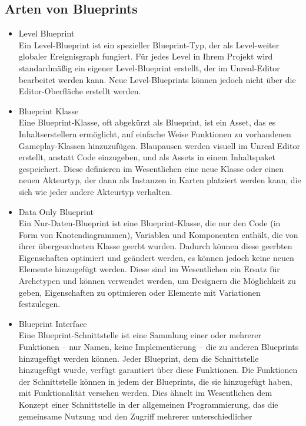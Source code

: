 \subsection{Arten von Blueprints}
\begin{itemize}
    \item Level Blueprint\\
    Ein Level-Blueprint ist ein spezieller Blueprint-Typ, der als Level-weiter globaler Ereignisgraph
    fungiert. Für jedes Level in Ihrem Projekt wird standardmäßig ein eigener Level-Blueprint erstellt,
    der im Unreal-Editor bearbeitet werden kann. Neue Level-Blueprints können jedoch nicht über die
    Editor-Oberfläche erstellt werden.
    \item Blueprint Klasse\\
    Eine Blueprint-Klasse, oft abgekürzt als Blueprint, ist ein Asset, das es Inhaltserstellern ermöglicht,
    auf einfache Weise Funktionen zu vorhandenen Gameplay-Klassen hinzuzufügen. Blaupausen werden visuell
    im Unreal Editor erstellt, anstatt Code einzugeben, und als Assets in einem Inhaltspaket gespeichert.
    Diese definieren im Wesentlichen eine neue Klasse oder einen neuen Akteurtyp, der dann als Instanzen in
    Karten platziert werden kann, die sich wie jeder andere Akteurtyp verhalten.
    \item Data Only Blueprint\\
    Ein Nur-Daten-Blueprint ist eine Blueprint-Klasse, die nur den Code (in Form von Knotendiagrammen),
    Variablen und Komponenten enthält, die von ihrer übergeordneten Klasse geerbt wurden. Dadurch können
    diese geerbten Eigenschaften optimiert und geändert werden, es können jedoch keine neuen Elemente hinzugefügt
    werden. Diese sind im Wesentlichen ein Ersatz für Archetypen und können verwendet werden, um Designern die
    Möglichkeit zu geben, Eigenschaften zu optimieren oder Elemente mit Variationen festzulegen.
    \item Blueprint Interface\\
    Eine Blueprint-Schnittstelle ist eine Sammlung einer oder mehrerer Funktionen – nur Namen, keine Implementierung –
    die zu anderen Blueprints hinzugefügt werden können. Jeder Blueprint, dem die Schnittstelle hinzugefügt wurde,
    verfügt garantiert über diese Funktionen. Die Funktionen der Schnittstelle können in jedem der Blueprints,
    die sie hinzugefügt haben, mit Funktionalität versehen werden. Dies ähnelt im Wesentlichen dem Konzept einer
    Schnittstelle in der allgemeinen Programmierung, das die gemeinsame Nutzung und den Zugriff mehrerer unterschiedlicher

\end{itemize}
